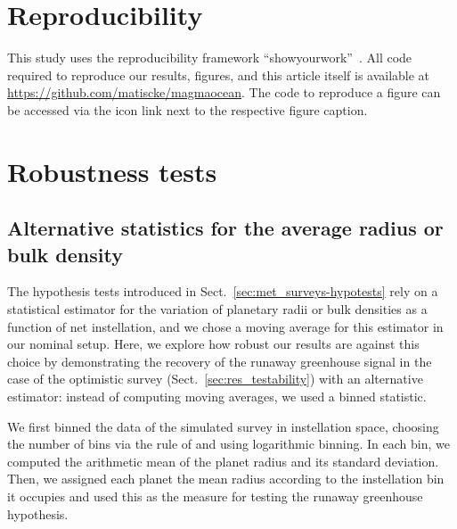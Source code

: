 \documentclass[twocolumn,twocolappendix]{aastex631}
\begin{document}
\section*{Reproducibility}
This study uses the reproducibility framework ``showyourwork''~\citep{Luger2021}.
All code required to reproduce our results, figures, and this article itself is available at \url{https://github.com/matiscke/magmaocean}.
The code to reproduce a figure can be accessed via the icon link next to the respective figure caption.




\appendix
\section{Robustness tests}
\subsection{Alternative statistics for the average radius or bulk density}\label{app:binnedstats}
The hypothesis tests introduced in Sect.~\ref{sec:met_surveys-hypotests} rely on a statistical estimator for the variation of planetary radii or bulk densities as a function of net instellation, and we chose a moving average for this estimator in our nominal setup.
Here, we explore how robust our results are against this choice by demonstrating the recovery of the runaway greenhouse signal in the case of the optimistic survey (Sect.~\ref{sec:res_testability}) with an alternative estimator: instead of computing moving averages, we used a binned statistic.

We first binned the data of the simulated survey in instellation space, choosing the number of bins via the rule of \citet{Freedman1981} and using logarithmic binning.
In each bin, we computed the arithmetic mean of the planet radius and its standard deviation.
Then, we assigned each planet the mean radius according to the instellation bin it occupies and used this as the measure for testing the runaway greenhouse hypothesis.
\end{document}
